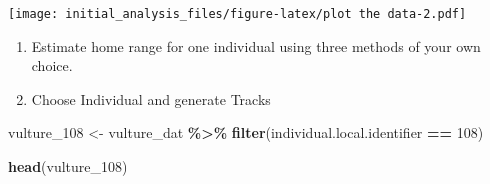 \documentclass[
]{article}
\newenvironment{Shaded}{\begin{snugshade}}{\end{snugshade}}
\newcommand{\DecValTok}[1]{\textcolor[rgb]{0.00,0.00,0.81}{#1}}
\newcommand{\FunctionTok}[1]{\textcolor[rgb]{0.13,0.29,0.53}{\textbf{#1}}}
\newcommand{\NormalTok}[1]{#1}
\newcommand{\OtherTok}[1]{\textcolor[rgb]{0.56,0.35,0.01}{#1}}
\newcommand{\SpecialCharTok}[1]{\textcolor[rgb]{0.81,0.36,0.00}{\textbf{#1}}}
\begin{document}
\texttt{[image: initial\_analysis\_files/figure-latex/plot the data-2.pdf]}

\begin{enumerate}
\def\labelenumi{\arabic{enumi}.}
\setcounter{enumi}{1}
\item
  Estimate home range for one individual using three methods of your own
  choice.
\item
  Choose Individual and generate Tracks
\end{enumerate}

\begin{Shaded}
\begin{Highlighting}[]
\NormalTok{vulture\_108 }\OtherTok{\textless{}{-}}\NormalTok{ vulture\_dat }\SpecialCharTok{\%\textgreater{}\%}
  \FunctionTok{filter}\NormalTok{(individual.local.identifier }\SpecialCharTok{==} \DecValTok{108}\NormalTok{)}

\FunctionTok{head}\NormalTok{(vulture\_108)}
\end{Highlighting}
\end{Shaded}
\end{document}

